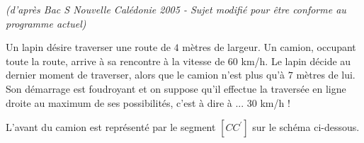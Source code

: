 \alpha
{}
%
\textit{(d'après Bac S Nouvelle Calédonie 2005 - Sujet modifié pour être conforme au programme actuel)}
\par
Un lapin désire traverser une route de $4$ mètres de largeur. Un camion, occupant toute la route, arrive à sa rencontre à la vitesse de $60$ km/h. Le lapin décide au dernier moment de traverser, alors que le camion n'est plus qu'à $7$ mètres de lui. Son démarrage est foudroyant et on suppose qu'il effectue la traversée en ligne droite au maximum de ses possibilités, c'est à dire à ...  $30$ km/h !
\par
L'avant du camion est représenté par le segment $\left[CC^{\prime}\right]$ sur le schéma ci-dessous.

